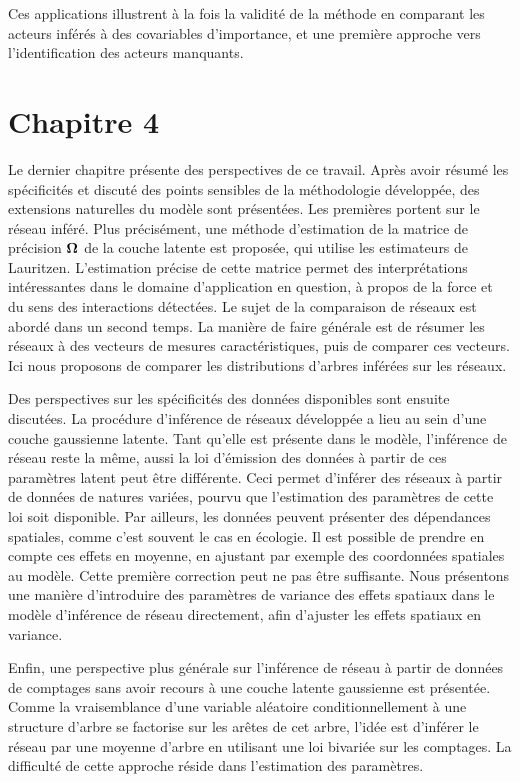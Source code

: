 Ces applications  illustrent à la fois la validité de la méthode en comparant les acteurs inférés à des covariables d'importance, et une première approche vers l'identification des acteurs manquants.

 
\section*{Chapitre 4}
Le dernier chapitre présente des perspectives de ce travail. Après avoir résumé les spécificités et discuté des points sensibles de la méthodologie développée, des extensions naturelles du modèle sont présentées.  Les premières  portent sur le réseau inféré. Plus précisément, une méthode d'estimation de la matrice de précision ${\boldsymbol{\Omega}}$ de la couche latente est proposée, qui utilise les estimateurs de Lauritzen. L'estimation précise de cette matrice permet des interprétations intéressantes dans le domaine d'application en question, à propos de la force et du sens des interactions détectées. Le sujet de la comparaison de réseaux est abordé dans un second temps. La manière de faire générale est de résumer les réseaux à des vecteurs de mesures caractéristiques, puis de comparer ces vecteurs. Ici nous proposons de comparer les distributions d'arbres inférées sur les réseaux. 

Des perspectives sur les spécificités des données  disponibles sont ensuite discutées. La procédure d'inférence de réseaux développée a lieu au sein d'une couche gaussienne latente. Tant qu'elle est présente dans le modèle, l'inférence de réseau reste la même, aussi la loi d'émission des données à partir de ces paramètres latent peut être différente. Ceci permet d'inférer des réseaux à partir de données de natures variées, pourvu que l'estimation des paramètres de cette loi soit disponible. Par ailleurs, les données peuvent présenter des dépendances spatiales, comme c'est souvent le cas en écologie. Il est possible de prendre en compte ces effets en moyenne, en ajustant par exemple des coordonnées spatiales au modèle. Cette première correction peut ne pas être suffisante. Nous présentons une manière d'introduire des paramètres de variance des effets spatiaux dans le modèle d'inférence de réseau directement, afin d'ajuster les effets spatiaux en variance.


Enfin, une perspective plus générale sur l'inférence de réseau à partir de données de comptages sans avoir recours à une couche latente gaussienne est présentée. Comme la vraisemblance d'une variable aléatoire conditionnellement à une structure d'arbre se factorise sur les arêtes de cet arbre, l'idée est d'inférer le réseau par une moyenne d'arbre en utilisant une loi bivariée sur les comptages. La difficulté de cette approche réside dans l'estimation des paramètres.
